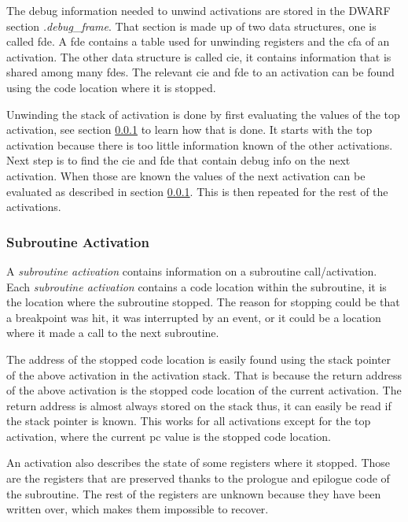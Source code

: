 The debug information needed to unwind activations are stored in the \gls{DWARF} section \emph{.debug\_frame}.
That section is made up of two data structures, one is called \gls{fde}.
A \gls{fde} contains a table used for unwinding registers and the \gls{cfa} of an activation.
The other data structure is called \gls{cie}, it contains information that is shared among many \glspl{fde}.
The relevant \gls{cie} and \gls{fde} to an activation can be found using the code location where it is stopped.


Unwinding the stack of activation is done by first evaluating the values of the top activation, see section \ref{sec:subact} to learn how that is done.
It starts with the top activation because there is too little information known of the other activations.
Next step is to find the \gls{cie} and \gls{fde} that contain debug info on the next activation.
When those are known the values of the next activation can be evaluated as described in section \ref{sec:subact}.
This is then repeated for the rest of the activations.


\subsubsection{Subroutine Activation} \label{sec:subact}
A \emph{subroutine activation} contains information on a subroutine call/activation.
Each \emph{subroutine activation} contains a code location within the subroutine, it is the location where the subroutine stopped.
The reason for stopping could be that a breakpoint was hit, it was interrupted by an event, or it could be a location where it made a call to the next subroutine.


The address of the stopped code location is easily found using the stack pointer of the above activation in the activation stack.
That is because the return address of the above activation is the stopped code location of the current activation.
The return address is almost always stored on the stack thus, it can easily be read if the stack pointer is known.
This works for all activations except for the top activation, where the current \gls{pc} value is the stopped code location.


An activation also describes the state of some registers where it stopped.
Those are the registers that are preserved thanks to the prologue and epilogue code of the subroutine.
The rest of the registers are unknown because they have been written over, which makes them impossible to recover.


